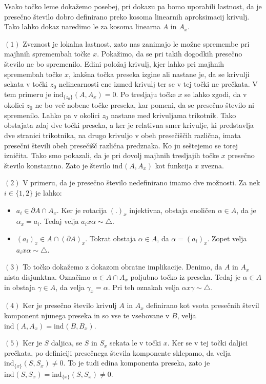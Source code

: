 \documentclass[mat1]{fmfdelo}
\newcommand{\ind}[3][]{\text{ind}_{#1}(#2, #3)}
\begin{document}
\proof
Vsako točko leme dokažemo posebej, pri dokazu pa bomo uporabili lastnost, da je presečno število dobro definirano preko kosoma linearnih aproksimacij krivulj. Tako lahko dokaz naredimo le za kosoma linearna $A$ in $A_x$.

$(1)$ Zveznost je lokalna lastnost, zato nas zanimajo le možne spremembe pri majhnih spremembah točke $x$. Pokažimo, da se pri takih dogodkih presečno število ne bo spremenilo. Edini položaj krivulj, kjer lahko pri majhnih spremembah točke $x$, kakšna točka preseka izgine ali nastane je, da se krivulji sekata v točki $z_0$ nelinearnosti ene izmed krivulj ter se v tej točki ne prečkata. V tem primeru je $\ind[\{z_0\}]{A}{A_x}=0$. Po tresljaju točke $x$ se lahko zgodi, da v okolici $z_0$ ne bo več nobene točke preseka, kar pomeni, da se presečno število ni spremenilo. Lahko pa v okolici $z_0$ nastane med krivuljama trikotnik. Tako obstajata zdaj dve točki preseka, a ker je relativna smer krivulje, ki predstavlja dve stranici trikotnika, na drugo krivuljo v obeh presečiščih različna, imata presečni števili obeh presečišč različna predznaka. Ko ju seštejemo se torej izničita. Tako smo pokazali, da je pri dovolj majhnih tresljajih točke $x$ presečno število konstantno. Zato je število $\ind{A}{A_x}$ kot funkcija $x$ zvezna.

$(2)$ V primeru, da je presečno število nedefinirano imamo dve možnosti. Za nek $i \in \{1, 2\}$ je lahko: 
\begin{itemize}
\item $a_i \in  \partial A \cap A_x$. Ker je rotacija $(.)_x$ injektivna, obstaja enoličen $\alpha \in A$, da je $\alpha_x = a_i$. Tedaj velja $a_ix\alpha \sim \triangle$.
\item $(a_i)_x \in A \cap (\partial A)_x$. Tokrat obstaja $\alpha \in A$, da $\alpha = (a_i)_x$. Zopet velja $a_ix\alpha \sim \triangle$.
\end{itemize}

$(3)$ To točko dokažemo z dokazom obratne implikacije. Denimo, da $A$ in $A_x$ nista disjunktna. Označimo $\alpha \in A \cap A_x$ poljubno točko iz preseka. Tedaj je $\alpha \in A$ in obstaja $\gamma \in A$, da velja $\gamma_x = \alpha$. Pri teh oznakah velja $\alpha x \gamma \sim \triangle$.

$(4)$ Ker je presečno število krivulj $A$ in $A_x$ definirano kot vsota presečnih števil komponent njunega preseka in so vse te vsebovane v $B$, velja $\ind{A}{A_x} = \ind{B}{B_x}$.

$(5)$ Ker je $S$ daljica, se $S$ in $S_x$ sekata le v točki $x$. Ker se v tej točki daljici prečkata, po definiciji presečnega števila komponente sklepamo, da velja $\ind[\{x\}]{S}{S_x} \neq 0$. To je tudi edina komponenta preseka, zato je $\ind{S}{S_x} = \ind[\{x\}]{S}{S_x} \neq 0$.
\endproof
\end{document}

